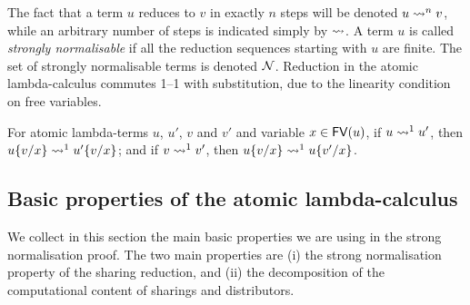 \documentclass[orivec]{llncs}
\begin{document}
%
%
%


The fact that a term $u$ reduces to $v$ in exactly $n$ steps will be denoted $u \rewrite^n v$, while an arbitrary number of steps is indicated simply by $\rewrite$.
%
A term $u$ is called \emph{strongly normalisable} if all the reduction sequences starting with $u$ are finite.
%
The set of strongly normalisable terms is denoted $\mathcal{N}$.
%
Reduction in the atomic lambda-calculus commutes 1--1 with substitution, due to the linearity condition on free variables.


\begin{ALlemma}
For atomic lambda-terms $u$, $u'$, $v$ and $v'$ and variable $x \in {\mathop{\mathsf{FV}}}(u)$,
%
if $u \rewrite^1 u'$, then $u\sub xv \rewrite^1 u'\sub xv$; and
if $v\rewrite^1 v'$, then $u\sub xv \rewrite^1 u\sub x{v'}$.
\end{ALlemma}


\subsection{Basic properties of the atomic lambda-calculus}
\label{ssec:basic properties}

We collect in this section the main basic properties we are using in the strong normalisation proof. The two main properties are (i) the strong normalisation property of the sharing reduction, and (ii) the  decomposition of the computational content of sharings and distributors.
\end{document}
